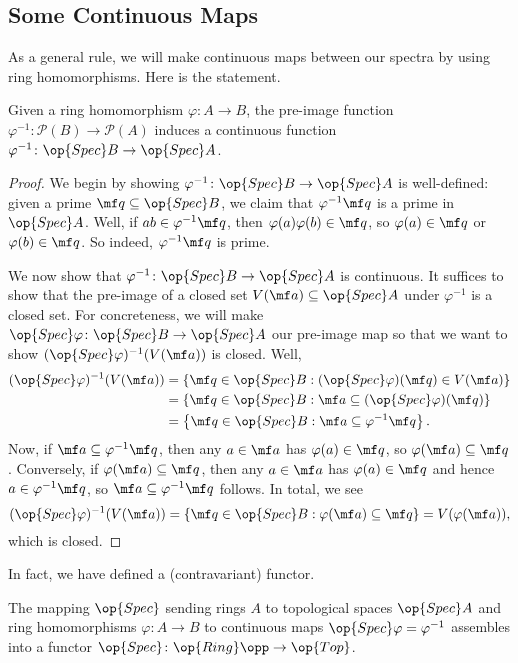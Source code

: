 \documentclass[../notes.tex]{subfiles}
\begin{document}
\subsection{Some Continuous Maps}
As a general rule, we will make continuous maps between our spectra by using ring homomorphisms. Here is the statement.
\begin{lemma} \label{lem:specmorphism}
	Given a ring homomorphism $\varphi\colon A\to B$, the pre-image function $\varphi^{-1}\colon\mathcal P(B)\to\mathcal P(A)$ induces a continuous function $\varphi^{-1}\colon\op{Spec}B\to\op{Spec}A$.
\end{lemma}
\begin{proof}
	We begin by showing $\varphi^{-1}\colon\op{Spec}B\to\op{Spec}A$ is well-defined: given a prime $\mf q\subseteq\op{Spec}B$, we claim that $\varphi^{-1}\mf q$ is a prime in $\op{Spec}A$. Well, if $ab\in\varphi^{-1}\mf q$, then $\varphi(a)\varphi(b)\in\mf q$, so $\varphi(a)\in\mf q$ or $\varphi(b)\in\mf q$. So indeed, $\varphi^{-1}\mf q$ is prime.

	We now show that $\varphi^{-1}\colon\op{Spec}B\to\op{Spec}A$ is continuous. It suffices to show that the pre-image of a closed set $V(\mf a)\subseteq\op{Spec}A$ under $\varphi^{-1}$ is a closed set. For concreteness, we will make $\op{Spec}\varphi\colon\op{Spec}B\to\op{Spec}A$ our pre-image map so that we want to show $(\op{Spec}\varphi)^{-1}(V(\mf a))$ is closed. Well,
	\begin{align*}
		(\op{Spec}\varphi)^{-1}(V(\mf a)) &= \{\mf q\in\op{Spec}B:(\op{Spec}\varphi)(\mf q)\in V(\mf a)\} \\
		&= \{\mf q\in\op{Spec}B:\mf a\subseteq(\op{Spec}\varphi)(\mf q)\} \\
		&= \left\{\mf q\in\op{Spec}B:\mf a\subseteq\varphi^{-1}\mf q\right\}.
	\end{align*}
	Now, if $\mf a\subseteq\varphi^{-1}\mf q$, then any $a\in\mf a$ has $\varphi(a)\in\mf q$, so $\varphi(\mf a)\subseteq\mf q$. Conversely, if $\varphi(\mf a)\subseteq\mf q$, then any $a\in\mf a$ has $\varphi(a)\in\mf q$ and hence $a\in\varphi^{-1}\mf q$, so $\mf a\subseteq\varphi^{-1}\mf q$ follows. In total, we see
	\[(\op{Spec}\varphi)^{-1}(V(\mf a))=\left\{\mf q\in\op{Spec}B:\varphi(\mf a)\subseteq\mf q\right\}=V(\varphi(\mf a)),\]
	which is closed.
\end{proof}
In fact, we have defined a (contravariant) functor.
\begin{proposition} \label{prop:specisfunctor}
	The mapping $\op{Spec}$ sending rings $A$ to topological spaces $\op{Spec}A$ and ring homomorphisms $\varphi\colon A\to B$ to continuous maps $\op{Spec}\varphi=\varphi^{-1}$ assembles into a functor ${\op{Spec}}\colon\op{Ring}\opp\to\op{Top}$.
\end{proposition}
\end{document}
